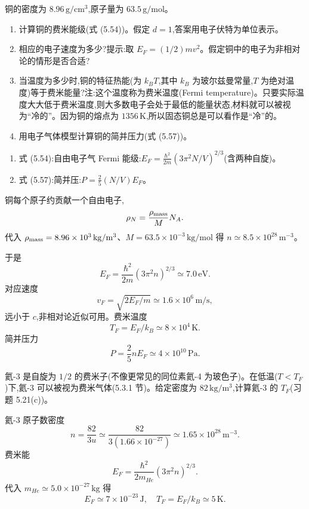 \begin{question}
铜的密度为 $8.96\,\mathrm{g/cm^3}$,原子量为 $63.5\,\mathrm{g/mol}$。
\begin{enumerate}
\item 计算铜的费米能级(式 (5.54))。假定 $d=1$,答案用电子伏特为单位表示。
\item 相应的电子速度为多少?提示:取 $E_F=(1/2)mv^2$。假定铜中的电子为非相对论的情形是否合适?
\item 当温度为多少时,铜的特征热能(为 $k_B T$,其中 $k_B$ 为玻尔兹曼常量,$T$ 为绝对温度)等于费米能量?注:这个温度称为费米温度(Fermi temperature)。只要实际温度大大低于费米温度,则大多数电子会处于最低的能量状态,材料就可以被视为“冷的”。因为铜的熔点为 $1356\,\mathrm K$,所以固态铜总是可以看作是“冷”的。
\item 用电子气体模型计算铜的简并压力(式 (5.57))。
\end{enumerate}

\par\smallskip
{}
\begin{enumerate}[leftmargin=2.2em,itemsep=0.12em,topsep=0.12em,parsep=0pt]
\item 式 (5.54):自由电子气 Fermi 能级:$E_F=\frac{\hbar^2}{2m}(3\pi^2N/V)^{2/3}$(含两种自旋)。
\item 式 (5.57):简并压:$P=\frac25(N/V)E_F$。
\end{enumerate}

\begin{solution}

铜每个原子约贡献一个自由电子,
\[
\rho_N=\frac{\rho_{\rm mass}}{M}N_A.
\]
代入 $\rho_{\rm mass}=8.96\times10^3\,\mathrm{kg/m^3}$、$M=63.5\times10^{-3}\,\mathrm{kg/mol}$ 得 $n\simeq8.5\times10^{28}\,\mathrm{m^{-3}}$。

于是
\[
E_F=\frac{\hbar^2}{2m}(3\pi^2n)^{2/3}\simeq7.0\,\mathrm{eV}.
\]
对应速度
\[
v_F=\sqrt{2E_F/m}\simeq1.6\times10^6\,\mathrm{m/s},
\]
远小于 $c$,非相对论近似可用。费米温度
\[
T_F=E_F/k_B\simeq8\times10^4\,\mathrm K.
\]
简并压力
\[
P=\frac25nE_F\simeq4\times10^{10}\,\mathrm{Pa}.
\]

\end{solution}
\end{question}

\begin{question}
氦-3 是自旋为 $1/2$ 的费米子(不像更常见的同位素氦-4 为玻色子)。在低温($T<T_F$)下,氦-3 可以被视为费米气体(5.3.1 节)。给定密度为 $82\,\mathrm{kg/m^3}$,计算氦-3 的 $T_F$(习题 5.21(c))。
\begin{solution}

氦-3 原子数密度
\[
n=\frac{82}{3u}\simeq\frac{82}{3(1.66\times10^{-27})}\simeq1.65\times10^{28}\,\mathrm{m^{-3}}.
\]
费米能
\[
E_F=\frac{\hbar^2}{2m_{He}}(3\pi^2n)^{2/3}.
\]
代入 $m_{He}\simeq5.0\times10^{-27}\,\mathrm{kg}$ 得
\[
E_F\simeq7\times10^{-23}\,\mathrm J,
\quad
T_F=E_F/k_B\simeq5\,\mathrm K.
\]

\end{solution}
\end{question}

